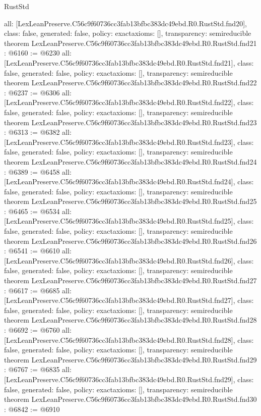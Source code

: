\begin{lexlean}{RustStd}
\begin{coremodule}
{  all: [LexLeanPreserve.C56c9f60736cc3fab13bfbc383dc49ebd.R0.RustStd.fnd20],
  class: false,
  generated: false,
  policy: exact{axioms: []},
  transparency: semireducible
}
theorem LexLeanPreserve.C56c9f60736cc3fab13bfbc383dc49ebd.R0.RustStd.fnd21 : @6160 := @6230 {
  all: [LexLeanPreserve.C56c9f60736cc3fab13bfbc383dc49ebd.R0.RustStd.fnd21],
  class: false,
  generated: false,
  policy: exact{axioms: []},
  transparency: semireducible
}
theorem LexLeanPreserve.C56c9f60736cc3fab13bfbc383dc49ebd.R0.RustStd.fnd22 : @6237 := @6306 {
  all: [LexLeanPreserve.C56c9f60736cc3fab13bfbc383dc49ebd.R0.RustStd.fnd22],
  class: false,
  generated: false,
  policy: exact{axioms: []},
  transparency: semireducible
}
theorem LexLeanPreserve.C56c9f60736cc3fab13bfbc383dc49ebd.R0.RustStd.fnd23 : @6313 := @6382 {
  all: [LexLeanPreserve.C56c9f60736cc3fab13bfbc383dc49ebd.R0.RustStd.fnd23],
  class: false,
  generated: false,
  policy: exact{axioms: []},
  transparency: semireducible
}
theorem LexLeanPreserve.C56c9f60736cc3fab13bfbc383dc49ebd.R0.RustStd.fnd24 : @6389 := @6458 {
  all: [LexLeanPreserve.C56c9f60736cc3fab13bfbc383dc49ebd.R0.RustStd.fnd24],
  class: false,
  generated: false,
  policy: exact{axioms: []},
  transparency: semireducible
}
theorem LexLeanPreserve.C56c9f60736cc3fab13bfbc383dc49ebd.R0.RustStd.fnd25 : @6465 := @6534 {
  all: [LexLeanPreserve.C56c9f60736cc3fab13bfbc383dc49ebd.R0.RustStd.fnd25],
  class: false,
  generated: false,
  policy: exact{axioms: []},
  transparency: semireducible
}
theorem LexLeanPreserve.C56c9f60736cc3fab13bfbc383dc49ebd.R0.RustStd.fnd26 : @6541 := @6610 {
  all: [LexLeanPreserve.C56c9f60736cc3fab13bfbc383dc49ebd.R0.RustStd.fnd26],
  class: false,
  generated: false,
  policy: exact{axioms: []},
  transparency: semireducible
}
theorem LexLeanPreserve.C56c9f60736cc3fab13bfbc383dc49ebd.R0.RustStd.fnd27 : @6617 := @6685 {
  all: [LexLeanPreserve.C56c9f60736cc3fab13bfbc383dc49ebd.R0.RustStd.fnd27],
  class: false,
  generated: false,
  policy: exact{axioms: []},
  transparency: semireducible
}
theorem LexLeanPreserve.C56c9f60736cc3fab13bfbc383dc49ebd.R0.RustStd.fnd28 : @6692 := @6760 {
  all: [LexLeanPreserve.C56c9f60736cc3fab13bfbc383dc49ebd.R0.RustStd.fnd28],
  class: false,
  generated: false,
  policy: exact{axioms: []},
  transparency: semireducible
}
theorem LexLeanPreserve.C56c9f60736cc3fab13bfbc383dc49ebd.R0.RustStd.fnd29 : @6767 := @6835 {
  all: [LexLeanPreserve.C56c9f60736cc3fab13bfbc383dc49ebd.R0.RustStd.fnd29],
  class: false,
  generated: false,
  policy: exact{axioms: []},
  transparency: semireducible
}
theorem LexLeanPreserve.C56c9f60736cc3fab13bfbc383dc49ebd.R0.RustStd.fnd30 : @6842 := @6910 {
}
\end{coremodule}
\end{lexlean}
